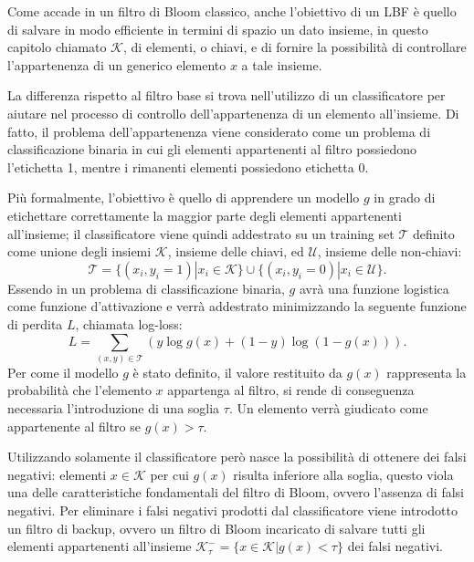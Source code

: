 \documentclass[../../main.tex]{subfiles}
\begin{document}
    Come accade in un filtro di Bloom classico, anche l'obiettivo di un LBF è quello di salvare in modo efficiente in termini di spazio un dato insieme, in questo capitolo chiamato $\mathcal{K}$, di elementi, o chiavi, e di fornire la possibilità di controllare l'appartenenza di un generico elemento $x$ a tale insieme.

    La differenza rispetto al filtro base si trova nell'utilizzo di un classificatore per aiutare nel processo di controllo dell'appartenenza di un elemento all'insieme. Di fatto, il problema dell'appartenenza viene considerato come un problema di classificazione binaria in cui gli elementi appartenenti al filtro possiedono l'etichetta 1, mentre i rimanenti elementi possiedono etichetta 0.

    Più formalmente, l'obiettivo è quello di apprendere un modello $g$ in grado di etichettare correttamente la maggior parte degli elementi appartenenti all'insieme; il classificatore viene quindi addestrato su un training set $\mathcal{T}$ definito come unione degli insiemi $\mathcal{K}$, insieme delle chiavi, ed $\mathcal{U}$, insieme delle non-chiavi:
    \begin{equation}
        \mathcal{T} = \{(x_i, y_i = 1) | x_i \in \mathcal{K}\} \cup \{(x_i, y_i = 0) | x_i \in \mathcal{U}\}.
    \end{equation}
    Essendo in un problema di classificazione binaria, $g$ avrà una funzione logistica come funzione d'attivazione e verrà addestrato minimizzando la seguente funzione di perdita $L$, chiamata log-loss:
    \begin{equation}
        L = \sum_{(x,y) \in \mathcal{T}}\left(y \log g(x) + (1 - y) \log(1 - g(x))\right).
        \label{eqn:logloss}
    \end{equation}
    Per come il modello $g$ è stato definito, il valore restituito da $g(x)$ rappresenta la probabilità che l'elemento $x$ appartenga al filtro, si rende di conseguenza necessaria l'introduzione di una soglia $\tau$. Un elemento verrà giudicato come appartenente al filtro se $g(x) > \tau$.
    
    Utilizzando solamente il classificatore però nasce la possibilità di ottenere dei falsi negativi: elementi $x \in \mathcal{K}$ per cui $g(x)$ risulta inferiore alla soglia, questo viola una delle caratteristiche fondamentali del filtro di Bloom, ovvero l'assenza di falsi negativi. Per eliminare i falsi negativi prodotti dal classificatore viene introdotto un filtro di backup, ovvero un filtro di Bloom incaricato di salvare tutti gli elementi appartenenti all'insieme $\mathcal{K}_{\tau}^- = \{x \in \mathcal{K} | g(x) < \tau\}$ dei falsi negativi.
\end{document}
